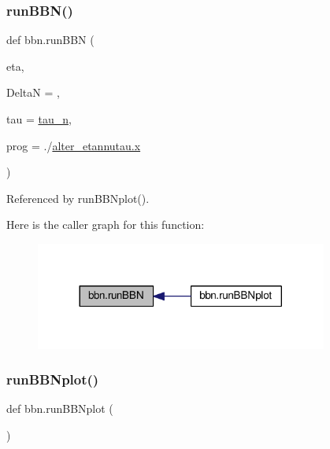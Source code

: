 \mbox{\label{namespacebbn_ae72b1fc1114a29eb8f18c248cf2809a2}} 
\subsubsection{\texorpdfstring{run\+B\+B\+N()}{runBBN()}}
{\footnotesize\ttfamily def bbn.\+run\+B\+BN (\begin{DoxyParamCaption}\item[{}]{eta,  }\item[{}]{DeltaN = {},  }\item[{}]{tau = {\ttfamily \mbox{\hyperlink{namespacebbn_a159aaa1465ea9c0555826fa3ea17d3ed}{tau\+\_\+n}}},  }\item[{}]{prog = {\ttfamily \textquotesingle{}./\mbox{\hyperlink{plotTT_8m_a9336ebf25087d91c818ee6e9ec29f8c1}{alter\+\_\+etannutau.\+x}}\textquotesingle{}} }\end{DoxyParamCaption})}



Referenced by run\+B\+B\+Nplot().

Here is the caller graph for this function\+:
\nopagebreak
\begin{figure}[H]
\begin{center}
\leavevmode
\includegraphics[width=272pt]{namespacebbn_ae72b1fc1114a29eb8f18c248cf2809a2_icgraph}
\end{center}
\end{figure}
\mbox{\label{namespacebbn_a3b8ec567ef2fdae1e1daf85d6d520717}} 
\subsubsection{\texorpdfstring{run\+B\+B\+Nplot()}{runBBNplot()}}
{\footnotesize\ttfamily def bbn.\+run\+B\+B\+Nplot (\begin{DoxyParamCaption}{ }\end{DoxyParamCaption})}



